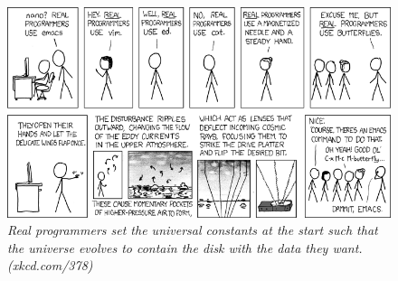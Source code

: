 \begin{figure}[h!]
\centering
\includegraphics[width=\linewidth]{img/xkcd/real_programmers.png}
\caption*{{\small \textit{Real programmers set the universal constants at the start such that the universe evolves to contain the disk with the data they want. (xkcd.com/378)}}}
\end{figure}
